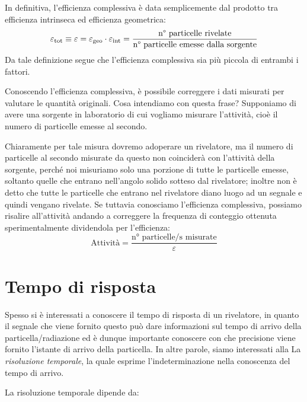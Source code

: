 In definitiva, l'efficienza complessiva è data semplicemente dal prodotto tra efficienza intrinseca ed efficienza geometrica:
\begin{equation*}
   \varepsilon_{\rm tot}
   \equiv \varepsilon
   =\varepsilon_{\rm geo} \cdot \varepsilon_{\rm int}
   =\frac{\text{n° particelle rivelate}}{\text{n° particelle emesse dalla sorgente}}
\end{equation*}
Da tale definizione segue che l'efficienza complessiva sia più piccola di entrambi i fattori.

\begin{esempio}
   Conoscendo l'efficienza complessiva, è possibile correggere i dati misurati per valutare le quantità originali. Cosa intendiamo con questa frase? Supponiamo di avere una sorgente in laboratorio di cui vogliamo misurare l'attività, cioè il numero di particelle emesse al secondo.

   Chiaramente per tale misura dovremo adoperare un rivelatore, ma il numero di particelle al secondo misurate da questo non coinciderà con l'attività della sorgente, perché noi misuriamo solo una porzione di tutte le particelle emesse, soltanto quelle che entrano nell'angolo solido sotteso dal rivelatore; inoltre non è detto che tutte le particelle che entrano nel rivelatore diano luogo ad un segnale e quindi vengano rivelate. Se tuttavia conosciamo l'efficienza complessiva, possiamo risalire all'attività andando a correggere la frequenza di conteggio ottenuta sperimentalmente dividendola per l'efficienza:
   \begin{equation*}
      \text{Attività}=\frac{\text{n° particelle/s misurate}}{\varepsilon}
   \end{equation*}
\end{esempio}

\section{Tempo di risposta}
Spesso si è interessati a conoscere il tempo di risposta di un rivelatore, in quanto il segnale che viene fornito questo può dare informazioni sul tempo di arrivo della particella/radiazione ed è dunque importante conoscere con che precisione viene fornito l'istante di arrivo della particella. In altre parole, siamo interessati alla La \textit{risoluzione temporale}, la quale esprime l'indeterminazione nella conoscenza del tempo di arrivo.

La risoluzione temporale dipende da:

